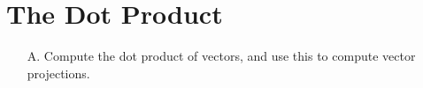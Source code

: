 \section{The Dot Product}

\begin{outcome}

\begin{enumerate}
\item[A.] Compute the dot product of vectors, and use this to compute vector projections.
\end{enumerate}
\end{outcome}